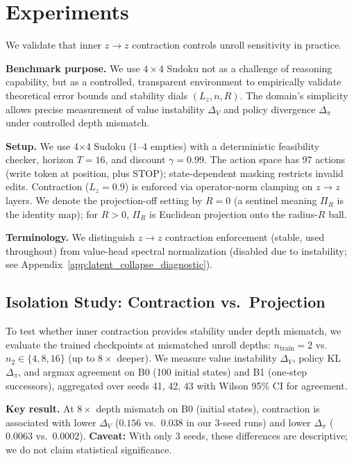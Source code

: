 \documentclass{article}
\theoremstyle{plain}
\theoremstyle{definition}
\theoremstyle{remark}
\newcommand{\shortonly}[1]{#1}
\newcommand{\shortonly}[1]{}
\begin{document}
\shortonly{
\section{Experiments}
\label{sec:experiments}

We validate that inner $z\!\to\!z$ contraction controls unroll sensitivity in practice.

\textbf{Benchmark purpose.} We use $4{\times}4$ Sudoku not as a challenge of reasoning capability, but as a controlled, transparent environment to empirically validate theoretical error bounds and stability dials $(L_z, n, R)$. The domain's simplicity allows precise measurement of value instability $\Delta_V$ and policy divergence $\Delta_\pi$ under controlled depth mismatch.

\textbf{Setup.}
We use 4$\times$4 Sudoku (1--4 empties) with a deterministic feasibility checker, horizon $T{=}16$, and discount $\gamma{=}0.99$.
The action space has 97 actions (write token at position, plus STOP); state-dependent masking restricts invalid edits.
Contraction ($L_z{=}0.9$) is enforced via operator-norm clamping on $z\!\to\!z$ layers.
We denote the projection-off setting by $R{=}0$ (a sentinel meaning $\Pi_R$ is the identity map); for $R>0$, $\Pi_R$ is Euclidean projection onto the radius-$R$ ball.

\textbf{Terminology.} We distinguish $z\!\to\!z$ contraction enforcement (stable, used throughout) from value-head spectral normalization (disabled due to instability; see Appendix~\ref{app:latent_collapse_diagnostic}).

\subsection{Isolation Study: Contraction vs.\ Projection}
\label{sec:isolation_study}

To test whether inner contraction provides stability under depth mismatch, we evaluate the trained checkpoints at mismatched unroll depths: $n_{\mathrm{train}}{=}2$ vs.\ $n_2\in\{4,8,16\}$ (up to $8\times$ deeper).
We measure value instability $\Delta_V$, policy KL $\Delta_\pi$, and argmax agreement on B0 (100 initial states) and B1 (one-step successors), aggregated over seeds 41, 42, 43 with Wilson 95\% CI for agreement.

\textbf{Key result.}
At $8\times$ depth mismatch on B0 (initial states), contraction is associated with lower $\Delta_V$ ($0.156$ vs.\ $0.038$ in our 3-seed runs) and lower $\Delta_\pi$ ($0.0063$ vs.\ $0.0002$). \textbf{Caveat:} With only 3 seeds, these differences are descriptive; we do not claim statistical significance.

}
\end{document}
